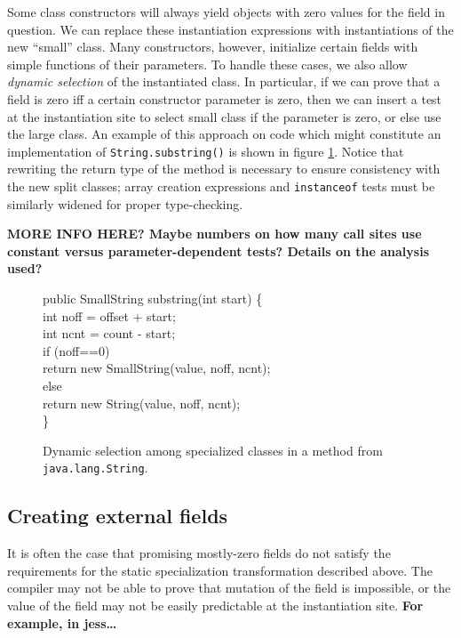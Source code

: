 \documentclass[preprint]{acmconf}
\begin{document}
Some class constructors will always yield objects with zero values for
the field in question.  We can replace these instantiation expressions
with instantiations of the new ``small'' class.  Many constructors,
however, initialize certain fields with simple functions of their
parameters.  To handle these cases, we also allow {\it dynamic
  selection} of the instantiated class.  In particular, if we can
prove that a field is zero iff a certain constructor parameter is
zero, then we can insert a test at the instantiation site to select
small class if the parameter is zero, or else use the large class.
An example of this approach on code which might constitute an
implementation of {\tt String.substring()} is shown in figure
\ref{fig:dyn-select}.  Notice that rewriting the return type of the
method is necessary to ensure consistency with the new split
classes; array creation expressions and {\tt instanceof} tests must be
similarly widened for proper type-checking.

{\bf MORE INFO HERE? Maybe numbers on how many call sites use constant
  versus parameter-dependent tests?  Details on the analysis used?}

\begin{figure}
\begin{samplecode}
public SmallString substring(int start) \{\\
\>int noff = offset + start;\\
\>int ncnt = count - start;\\
\>if (noff==0)\\
\>\>return new SmallString(value, noff, ncnt);\\
\>else\\
\>\>return new String(value, noff, ncnt);\\
\}\\
\end{samplecode}
\caption{Dynamic selection among specialized classes in a method
  from {\tt java.lang.String}.}
\label{fig:dyn-select}
\end{figure}

\subsection{Creating external fields}
It is often the case that promising mostly-zero fields do not satisfy
the requirements for the static specialization transformation
described above.  The compiler may not be able to prove that mutation
of the field is impossible, or the value of the field may not be
easily predictable at the instantiation site.
{\bf For example, in jess\ldots } %
\end{document}
